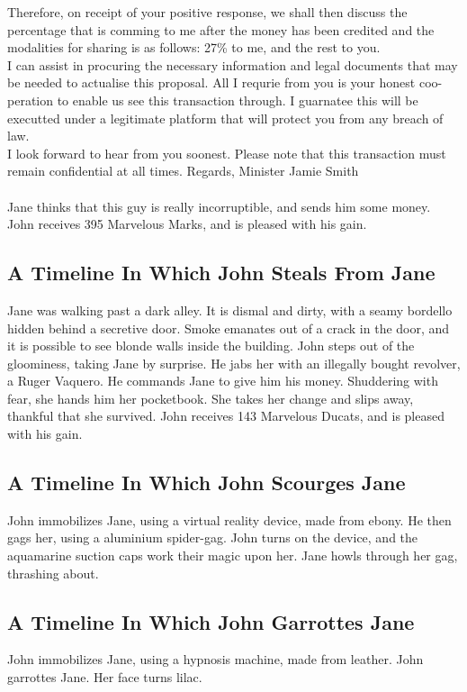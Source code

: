 \documentclass{article}
\begin{document}
Therefore, on receipt of your positive response, we shall then discuss the percentage that is comming to me after the money has been credited and the modalities for sharing is as follows: 27\% to me, and the rest to you.
\\
I can assist in procuring the necessary information and legal documents that may be needed to actualise this proposal.
All I requrie from you is your honest coo{-}peration to enable us see this transaction through.
I guarnatee this will be executted under a legitimate platform that will protect you from any breach of law.
\\
I look forward to hear from you soonest.
Please note that this transaction must remain confidential at all times.
Regards, Minister Jamie Smith
\\\\
Jane thinks that this guy is really incorruptible, and sends him some money.
John receives 395 Marvelous Marks, and is pleased with his gain.
\subsection{A Timeline In Which John Steals From Jane}


Jane was walking past a dark alley.
It is dismal and dirty, with a seamy bordello hidden behind a secretive door.
Smoke emanates out of a crack in the door, and it is possible to see blonde walls inside the building.
John steps out of the gloominess, taking Jane by surprise.
He jabs her with an illegally bought revolver, a Ruger Vaquero.
He commands Jane to give him his money.
Shuddering with fear, she hands him her pocketbook.
She takes her change and slips away, thankful that she survived.
John receives 143 Marvelous Ducats, and is pleased with his gain.
\subsection{A Timeline In Which John Scourges Jane}


John immobilizes Jane, using a virtual reality device, made from ebony.
He then gags her, using a aluminium spider{-}gag.
John turns on the device, and the aquamarine suction caps work their magic upon her.
Jane howls through her gag, thrashing about.
\subsection{A Timeline In Which John Garrottes Jane}


John immobilizes Jane, using a hypnosis machine, made from leather.
John garrottes Jane.
Her face turns lilac.
\end{document}
